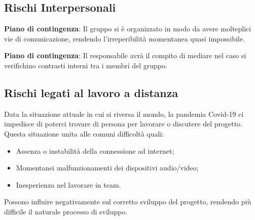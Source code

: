 	\subsection{Rischi Interpersonali}
		\def\productquality{
			{
        			Irreperibilita
				momentanea
				RI1,
        			Potrebbero verificarsi momenti in cui uno o più membri del team siano irreperibili, 
        			è responsabilità di ogni membro del gruppo comunicare eventuali imprevisti e organizzarsi in modo da non ostacolare il calendario delle consegne,
        			Occorrenza: Bassa 
				Pericolosità: Media
    			},
		}
		
		\textbf{Piano di contingenza}: Il gruppo si è organizzato in modo da avere molteplici vie di comunicazione, rendendo l'irreperibilità momentanea quasi impossibile.
		\pagebreak
		\def\productquality{
			{
        			Contrasti 
				interni
				RI2,
        			Potrebbero verificarsi divergenze tra i membri del gruppo, 
        			Ciascuno dei membri del team si impegna ad agire al fine di non ostacolare il naturale svolgimento del progetto e discutere di eventuali problemi solo in seduta di riunione,
        			Occorrenza: Bassa 
				Pericolosità: Media
    			},
		}
		
		\textbf{Piano di contingenza}: Il responsabile avrà il compito di mediare nel caso si verifichino contrasti interni tra i membri del gruppo.
	\subsection{Rischi legati al lavoro a distanza}
		Data la situazione attuale in cui si riversa il mondo, la pandemia Covid-19 ci impedisce di poterci trovare di persona per lavorare o discutere del progetto. Questa situazione unita alle comuni difficoltà quali:
		\begin{itemize}
			\item Assenza o instabilità della connessione ad internet;
			\item Momentanei malfunzionamenti dei dispositivi audio/video;
			\item Inesperienza nel lavorare in team.
		\end{itemize}
		Possono influire negativamente sul corretto sviluppo del progetto, rendendo più difficile il naturale processo di sviluppo.
